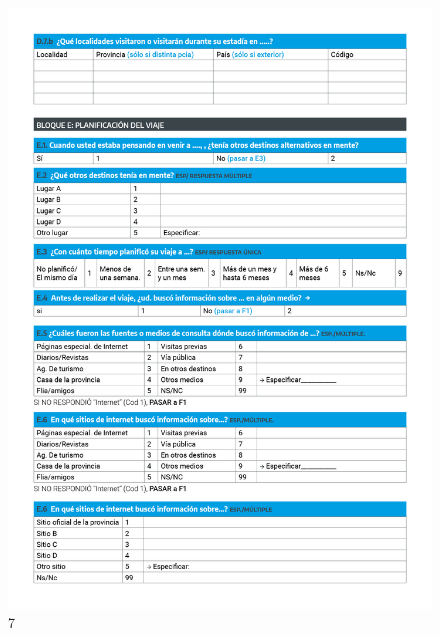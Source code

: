 \documentclass[
]{book}
\begin{document}
\begin{figure}

{\centering \includegraphics[width=1\linewidth]{imagenes/graf07} 

}

\caption{7}\label{fig:007}
\end{figure}
\end{document}
